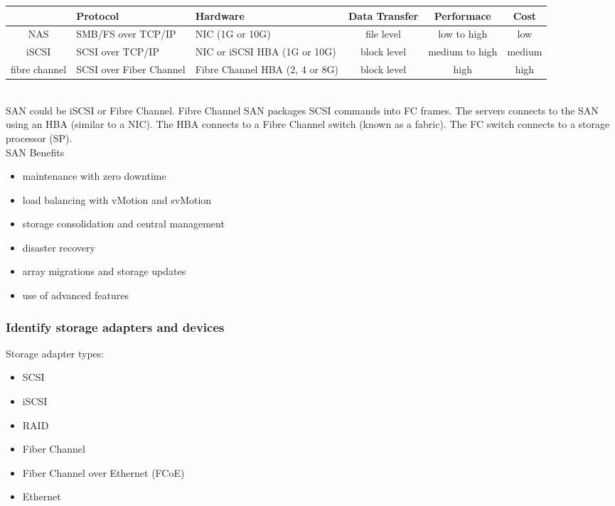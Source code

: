 \begin{tabular}{ | c | p{2cm} | p{2cm} | c | c | c | }
\hline
& Protocol & Hardware & Data Transfer & Performace & Cost \\ \hline
NAS & SMB/FS over TCP/IP & NIC (1G or 10G) & file level & low to high & low \\ \hline
iSCSI & SCSI over TCP/IP & NIC or iSCSI HBA (1G or 10G) & block level & medium to high & medium \\ \hline
fibre channel & SCSI over Fiber Channel & Fibre Channel HBA (2, 4 or 8G) & block level & high & high \\ \hline
\end{tabular}\\

SAN could be iSCSI or Fibre Channel. Fibre Channel SAN packages SCSI commands
into FC frames. The servers connects to the SAN using an HBA (similar to a
NIC). The HBA connects to a Fibre Channel switch (known as a fabric). The FC
switch connects to a storage processor (SP).\\

SAN Benefits

\begin{itemize}
\item maintenance with zero downtime
\item load balancing with vMotion and svMotion
\item storage consolidation and central management
\item disaster recovery
\item array migrations and storage updates
\item use of advanced features
\end{itemize}

\subsubsection{Identify storage adapters and devices}

Storage adapter types:

\begin{itemize}
\item SCSI
\item iSCSI
\item RAID
\item Fiber Channel
\item Fiber Channel over Ethernet (FCoE)
\item Ethernet
\end{itemize}

